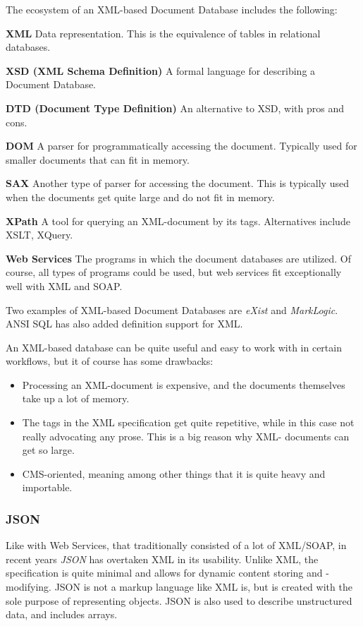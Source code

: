 The ecosystem of an XML-based Document Database includes the following:

\noindent \textbf{XML} Data representation. This is the equivalence of tables in
    relational databases.

\noindent \textbf{XSD (XML Schema Definition)} A formal language for describing a
    Document Database.

\noindent \textbf{DTD (Document Type Definition)} An alternative to XSD, with pros and
    cons.

\noindent \textbf{DOM} A parser for programmatically accessing the document. Typically
    used for smaller documents that can fit in memory.

\noindent \textbf{SAX} Another type of parser for accessing the document. This is
    typically used when the documents get quite large and do not fit in
    memory.

\noindent \textbf{XPath} A tool for querying an XML-document by its tags. Alternatives
    include XSLT, XQuery.

\noindent \textbf{Web Services} The programs in which the document databases are
    utilized. Of course, all types of programs could be used, but web
    services fit exceptionally well with XML and SOAP.

Two examples of XML-based Document Databases are \emph{eXist} and
\emph{MarkLogic}. ANSI SQL has also added definition support for XML.

An XML-based database can be quite useful and easy to work with in certain
workflows, but it of course has some drawbacks:
\begin{itemize}
    \item Processing an XML-document is expensive, and the documents themselves
        take up a lot of memory.
    \item The tags in the XML specification get quite repetitive, while in this
        case not really advocating any prose. This is a big reason why XML-
        documents can get so large.
    \item CMS-oriented, meaning among other things that it is quite heavy
        and importable.
\end{itemize}

\subsubsection{JSON}
\label{intro-doc-json}
Like with Web Services, that traditionally consisted of a lot of XML/SOAP,
in recent years \emph{JSON} has overtaken XML in its usability. Unlike XML,
the specification is quite minimal and allows for dynamic content storing and
-modifying. JSON is not a markup language like XML is, but is created with the
sole purpose of representing objects. JSON is also used to describe unstructured
data, and includes arrays.

